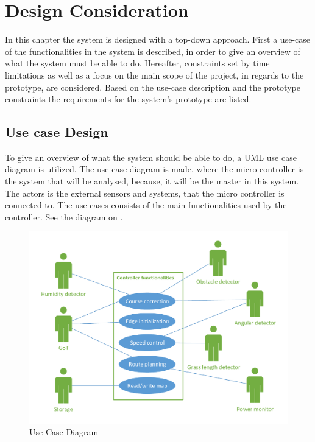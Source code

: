 \chapter{Design Consideration}
\vspace{-5 mm}
In this chapter the system is designed with a top-down approach. First a use-case of the functionalities in the system is described, in order to give an overview of what the system must be able to do. Hereafter, constraints set by time limitations as well as a focus on the main scope of the project, in regards to the prototype, are considered. Based on the use-case description and the prototype constraints the requirements for the system's prototype are listed.
\vspace{-4 mm}
\section{Use case Design}
To give an overview of what the system should be able to do, a UML use case diagram is utilized. The use-case diagram is made, where the micro controller is the system that will be analysed, because, it will be the master in this system. The actors is the external sensors and systems, that the micro controller is connected to. The use cases consists of the main functionalities used by the controller. See the diagram on . 

\vspace{-3 mm}
 \begin{figure}[H]
	\centering
	\includegraphics[scale=0.8]{figures/P5UseCase.pdf}
	\caption{Use-Case Diagram}
	\label{fig:usecase}
\end{figure}

